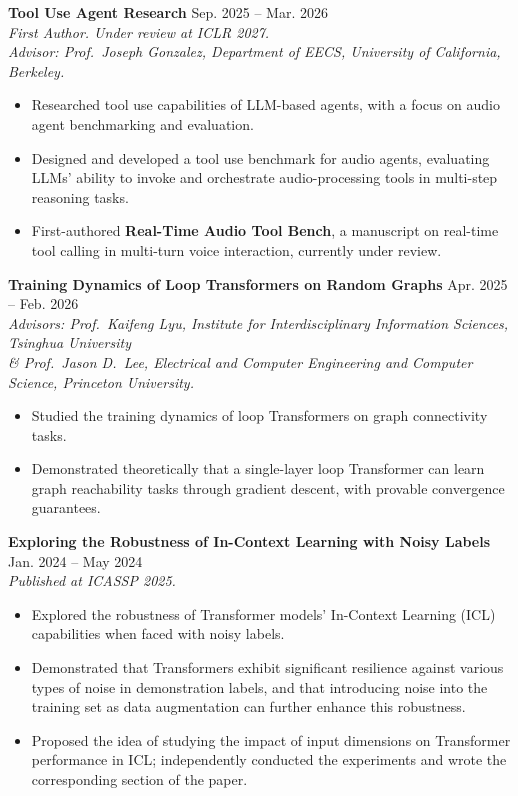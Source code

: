 \documentclass[a4paper,9pt]{extarticle}
\begin{document}
    \noindent
    \textbf{Tool Use Agent Research} \hfill Sep. 2025 -- Mar. 2026 \\
    \textit{First Author. Under review at ICLR 2027.}\\
    \textit{Advisor: Prof.\ Joseph Gonzalez, Department of EECS, University of California, Berkeley.}
    \begin{itemize}
        \item Researched tool use capabilities of LLM-based agents, with a focus on audio agent benchmarking and evaluation.
        \item Designed and developed a tool use benchmark for audio agents, evaluating LLMs' ability to invoke and orchestrate audio-processing tools in multi-step reasoning tasks.
        \item First-authored \textbf{Real-Time Audio Tool Bench}, a manuscript on real-time tool calling in multi-turn voice interaction, currently under review.
    \end{itemize}

    \noindent
    \textbf{Training Dynamics of Loop Transformers on Random Graphs} \hfill Apr. 2025 -- Feb. 2026 \\
    \textit{Advisors: Prof.\ Kaifeng Lyu, Institute for Interdisciplinary Information Sciences, Tsinghua University} \\
    \textit{\& Prof.\ Jason D.\ Lee, Electrical and Computer Engineering and Computer Science, Princeton University.}
    \begin{itemize}
        \item Studied the training dynamics of loop Transformers on graph connectivity tasks.
        \item Demonstrated theoretically that a single-layer loop Transformer can learn graph reachability tasks through gradient descent, with provable convergence guarantees.
    \end{itemize}
    
    \noindent
    \textbf{Exploring the Robustness of In-Context Learning with Noisy Labels} \hfill Jan. 2024 -- May 2024 \\
    \textit{Published at ICASSP 2025.}
    \begin{itemize}
        \item Explored the robustness of Transformer models' In-Context Learning (ICL) capabilities when faced with noisy labels.
        \item Demonstrated that Transformers exhibit significant resilience against various types of noise in demonstration labels, and that introducing noise into the training set as data augmentation can further enhance this robustness.
        \item Proposed the idea of studying the impact of input dimensions on Transformer performance in ICL; independently conducted the experiments and wrote the corresponding section of the paper.
    \end{itemize}
\end{document}
